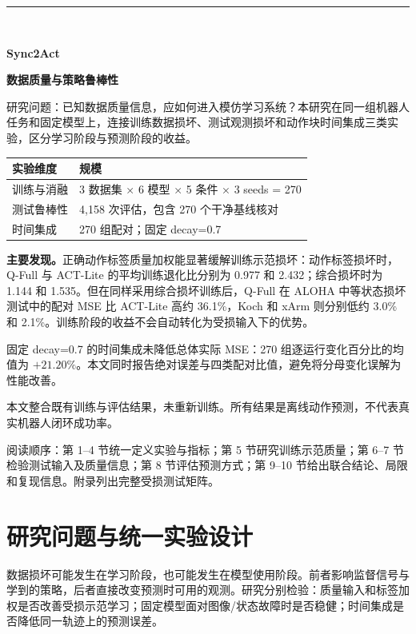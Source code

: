\documentclass[11pt,a4paper,fontset=fandol]{ctexart}
\newcommand{\note}[1]{\begin{tcolorbox}[colback=panel,colframe=rule,boxrule=0.5pt,arc=1mm]#1\end{tcolorbox}}
\begin{document}
\thispagestyle{empty}
\vspace*{12mm}
{\color{blue}\rule{25mm}{2.5pt}}\\[7mm]
{\fontsize{30}{36}\selectfont\bfseries\color{navy}Sync2Act\par}
\vspace{5mm}
{\LARGE\bfseries\color{navy}数据质量与策略鲁棒性\par}
\vspace{5mm}{\large v1\_4\_0 / 2026-10-07}\par\vspace{6mm}
\note{研究问题：已知数据质量信息，应如何进入模仿学习系统？本研究在同一组机器人任务和固定模型上，连接训练数据损坏、测试观测损坏和动作块时间集成三类实验，区分学习阶段与预测阶段的收益。}
\begin{center}
\small
\begin{tabular}{lp{121mm}}
\toprule
实验维度 & 规模 \\
\midrule
训练与消融 & 3 数据集 × 6 模型 × 5 条件 × 3 seeds = 270 \\
测试鲁棒性 & 4,158 次评估，包含 270 个干净基线核对 \\
时间集成 & 270 组配对；固定 decay=0.7 \\
\bottomrule
\end{tabular}
\end{center}
\textbf{主要发现。}正确动作标签质量加权能显著缓解训练示范损坏：动作标签损坏时，Q-Full 与 ACT-Lite 的平均训练退化比分别为 0.977 和 2.432；综合损坏时为 1.144 和 1.535。但在同样采用综合损坏训练后，Q-Full 在 ALOHA 中等状态损坏测试中的配对 MSE 比 ACT-Lite 高约 36.1\%，Koch 和 xArm 则分别低约 3.0\% 和 2.1\%。训练阶段的收益不会自动转化为受损输入下的优势。

固定 decay=0.7 的时间集成未降低总体实际 MSE：270 组逐运行变化百分比的均值为 $+21.20\%$。本文同时报告绝对误差与四类配对比值，避免将分母变化误解为性能改善。

\vfill\note{本文整合既有训练与评估结果，未重新训练。所有结果是离线动作预测，不代表真实机器人闭环成功率。}
\clearpage\begingroup\setlength{\parskip}{0pt}\tableofcontents\endgroup
\vspace{8mm}\note{阅读顺序：第 1--4 节统一定义实验与指标；第 5 节研究训练示范质量；第 6--7 节检验测试输入及质量信息；第 8 节评估预测方式；第 9--10 节给出联合结论、局限和复现信息。附录列出完整受损测试矩阵。}
\clearpage\section{研究问题与统一实验设计}
数据损坏可能发生在学习阶段，也可能发生在模型使用阶段。前者影响监督信号与学到的策略，后者直接改变预测时可用的观测。研究分别检验：质量输入和标签加权是否改善受损示范学习；固定模型面对图像/状态故障时是否稳健；时间集成是否降低同一轨迹上的预测误差。
\end{document}
